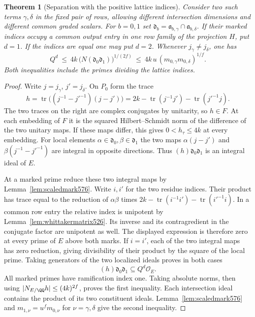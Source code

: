 \documentclass[a4paper,11pt]{article}
\newtheorem{theorem}[proposition]{Theorem}
\theoremstyle{definition}
\theoremstyle{remark}
\numberwithin{equation}{section}
\begin{document}
\begin{theorem}[Separation with the positive lattice indices]
\leavevmode\label{thm:positivecompare576}
Consider two such terms \(\gamma,\delta\) in the fixed pair of
rows, allowing different intersection dimensions and different
common graded scalars. For \(b=0,1\) set
\(\mathfrak d_b=\mathfrak a_{b,\gamma}\cap\mathfrak a_{b,\delta}\).
If their marked indices occupy a common output entry in one
row family of the projection \(H\), put \(d=1\). If the
indices are equal one may put \(d=2\). Whenever
\(j_\gamma\ne j_\delta\), one has
\[
 Q^d\ \le\ 4k\,\bigl(N(\mathfrak d_0\mathfrak d_1)\bigr)^{1/(2f)}
 \ \le\ 4k\,u\,(m_{0,\gamma}m_{0,\delta})^{1/f}.
\]
Both inequalities include the primes dividing the lattice indices.
\end{theorem}
\begin{proof}
Write \(j=j_\gamma\), \(j'=j_\delta\). On \(P_0\) form the trace
\[
 h=\operatorname{tr}\big((j^{-1}-{j'}^{-1})(j-j')\big)
    =2k-\operatorname{tr}(j^{-1}j')-\operatorname{tr}({j'}^{-1}j).
\]
The two traces on the right are complex conjugates by unitarity,
so \(h\in F\). At each embedding of \(F\) it is the squared
Hilbert--Schmidt norm of the difference of the two unitary
maps. If these maps differ, this gives \(0<h_\tau\le4k\) at
every embedding. For local elements
\(\alpha\in\mathfrak d_0,\beta\in\mathfrak d_1\) the two maps
\(\alpha(j-j')\) and \(\beta(j^{-1}-{j'}^{-1})\) are integral
in opposite directions. Thus \((h)\mathfrak d_0\mathfrak d_1\)
is an integral ideal of \(E\).

At a marked prime reduce these two integral maps by
Lemma~\ref{lem:scaledmark576}. Write \(i,i'\) for the two
residue indices. Their product has trace equal to the reduction
of \(\alpha\beta\) times
\(2k-\operatorname{tr}(i^{-1}i')-\operatorname{tr}({i'}^{-1}i)\).
In a common row entry the relative index is unipotent by
Lemma~\ref{lem:whittakermatrix526}. Its inverse and its
contragredient in the conjugate factor are unipotent as well.
The displayed expression is therefore zero at every prime of
\(E\) above both marks. If \(i=i'\), each of the two integral
maps has zero reduction, giving divisibility of their product
by the square of the local prime. Taking generators of the
two localized ideals proves in both cases
\[
           (h)\mathfrak d_0\mathfrak d_1\subseteq Q^d\mathcal O_E.
\]
All marked primes have ramification index one. Taking absolute
norms, then using \(|N_{E/\QQ}h|\le(4k)^{2f}\), proves the
first inequality. Each intersection ideal contains the product
of its two constituent ideals. Lemma~\ref{lem:scaledmark576}
and \(m_{1,\nu}=u^fm_{0,\nu}\) for \(\nu=\gamma,\delta\)
give the second inequality.
\end{proof}
\end{document}
